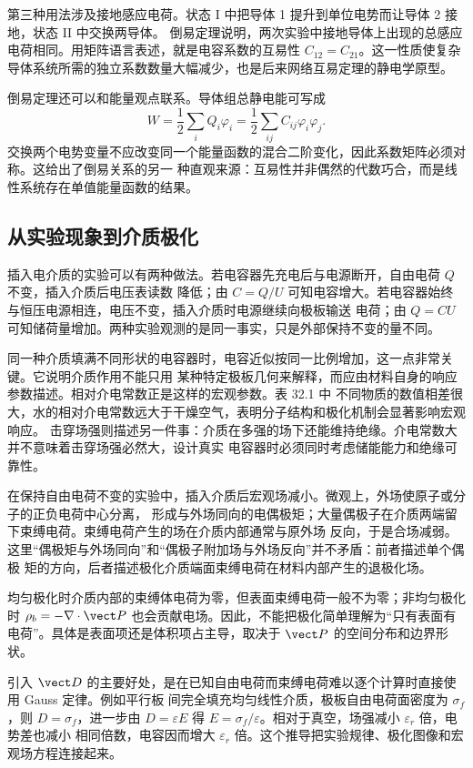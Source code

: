 第三种用法涉及接地感应电荷。状态 I 中把导体 1 提升到单位电势而让导体 2 接地，状态 II 中交换两导体。
倒易定理说明，两次实验中接地导体上出现的总感应电荷相同。用矩阵语言表述，就是电容系数的互易性
$C_{12}=C_{21}$。这一性质使复杂导体系统所需的独立系数数量大幅减少，也是后来网络互易定理的静电学原型。

倒易定理还可以和能量观点联系。导体组总静电能可写成
\[
 W=\frac12\sum_iQ_i\varphi_i
   =\frac12\sum_{ij}C_{ij}\varphi_i\varphi_j.
\]
交换两个电势变量不应改变同一个能量函数的混合二阶变化，因此系数矩阵必须对称。这给出了倒易关系的另一
种直观来源：互易性并非偶然的代数巧合，而是线性系统存在单值能量函数的结果。

\subsection*{从实验现象到介质极化}

插入电介质的实验可以有两种做法。若电容器先充电后与电源断开，自由电荷 $Q$ 不变，插入介质后电压表读数
降低；由 $C=Q/U$ 可知电容增大。若电容器始终与恒压电源相连，电压不变，插入介质时电源继续向极板输送
电荷；由 $Q=CU$ 可知储荷量增加。两种实验观测的是同一事实，只是外部保持不变的量不同。

同一种介质填满不同形状的电容器时，电容近似按同一比例增加，这一点非常关键。它说明介质作用不能只用
某种特定极板几何来解释，而应由材料自身的响应参数描述。相对介电常数正是这样的宏观参数。表 32.1 中
不同物质的数值相差很大，水的相对介电常数远大于干燥空气，表明分子结构和极化机制会显著影响宏观响应。
击穿场强则描述另一件事：介质在多强的场下还能维持绝缘。介电常数大并不意味着击穿场强必然大，设计真实
电容器时必须同时考虑储能能力和绝缘可靠性。

在保持自由电荷不变的实验中，插入介质后宏观场减小。微观上，外场使原子或分子的正负电荷中心分离，
形成与外场同向的电偶极矩；大量偶极子在介质两端留下束缚电荷。束缚电荷产生的场在介质内部通常与原外场
反向，于是合场减弱。这里“偶极矩与外场同向”和“偶极子附加场与外场反向”并不矛盾：前者描述单个偶极
矩的方向，后者描述极化介质端面束缚电荷在材料内部产生的退极化场。

均匀极化时介质内部的束缚体电荷为零，但表面束缚电荷一般不为零；非均匀极化时 $\rho_b=-\nabla\cdot\vect P$
也会贡献电场。因此，不能把极化简单理解为“只有表面有电荷”。具体是表面项还是体积项占主导，取决于
$\vect P$ 的空间分布和边界形状。

引入 $\vect D$ 的主要好处，是在已知自由电荷而束缚电荷难以逐个计算时直接使用 Gauss 定律。例如平行板
间完全填充均匀线性介质，极板自由电荷面密度为 $\sigma_f$，则 $D=\sigma_f$，进一步由
$D=\varepsilon E$ 得 $E=\sigma_f/\varepsilon$。相对于真空，场强减小 $\varepsilon_r$ 倍，电势差也减小
相同倍数，电容因而增大 $\varepsilon_r$ 倍。这个推导把实验规律、极化图像和宏观场方程连接起来。

